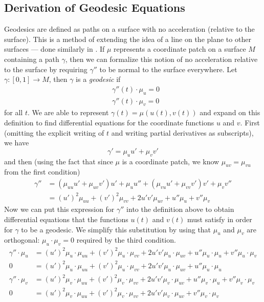 \documentclass[12pt]{article}
\begin{document}
	\subsection{Derivation of Geodesic Equations}
		Geodesics are defined as paths on a surface with no acceleration (relative to the surface).
		This is a method of extending the idea of a line on the plane to other surfaces --- done similarly in \cite{Lewis_GeodesicsMathematica_2002}.
		If $\mu$ represents a coordinate patch on a surface $M$ containing a path $\gamma$, then we can formalize this notion of no acceleration relative to the surface by requiring $\gamma''$ to be normal to the surface everywhere.
		Let $\gamma:[0,1] \to M$, then $\gamma$ is a \emph{geodesic} if
		\begin{align*}
			&\gamma''(t) \cdot \mu_u = 0 \\
			&\gamma''(t) \cdot \mu_v = 0
		\end{align*}
		for all $t$.
		We are able to represent $\gamma(t) = \mu( u(t) , v(t) )$ and expand on this definition to find differential equations for the coordinate functions $u$ and $v$.
		First (omitting the explicit writing of $t$ and writing partial derivatives as subscripts), we have
		\begin{equation*}
			\gamma' = \mu_u u'+\mu_v v'
		\end{equation*}
		and then (using the fact that since $\mu$ is a coordinate patch, we know $\mu_{uv}=\mu_{vu}$ from the first condition)
		\begin{equation*} \begin{split}
			\gamma'' & = (\mu_{uu} u' + \mu_{uv} v')u' + \mu_u u'' + (\mu_{vu} u' + \mu_{vv} v') v' + \mu_v v'' \\
					 & = (u')^2 \mu_{uu} + (v')^2\mu_{vv} + 2u' v'\mu_{uv} + u''\mu_u + v''\mu_v
		\end{split} \end{equation*}
		Now we can put this expression for $\gamma''$ into the definition above to obtain differential equations that the functions $u(t)$ and $v(t)$ must satisfy in order for $\gamma$ to be a geodesic.
		We simplify this substitution by using that $\mu_u$ and $\mu_v$ are orthogonal: $\mu_u \cdot \mu_v = 0$ required by the third condition.
		\begin{align*}
			\gamma'' \cdot \mu_u & = (u')^2\mu_u \cdot \mu_{uu} + (v')^2\mu_u \cdot \mu_{vv} + 2u' v'\mu_u \cdot \mu_{uv} + u''\mu_u \cdot \mu_u + v''\mu_u \cdot \mu_v \\
			0 & = (u')^2\mu_u \cdot \mu_{uu} + (v')^2\mu_u \cdot \mu_{vv} + 2u' v'\mu_u \cdot \mu_{uv} + u''\mu_u \cdot \mu_u \\
			\gamma'' \cdot \mu_v & = (u')^2\mu_v \cdot \mu_{uu} + (v')^2\mu_v \cdot \mu_{vv} + 2u' v'\mu_v \cdot \mu_{uv} + u''\mu_v \cdot \mu_u + v''\mu_v \cdot \mu_v \\
			0 & = (u')^2\mu_v \cdot \mu_{uu} + (v')^2\mu_v \cdot \mu_{vv} + 2u' v'\mu_v \cdot \mu_{uv} + v''\mu_v \cdot \mu_v \\
		\end{align*}
\end{document}
